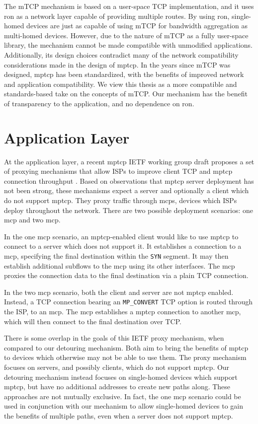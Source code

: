 \documentclass{cwru}
\begin{document}
The mTCP mechanism is based on a user-space TCP implementation, and it uses
\ac{ron} \cite{ron} as a network layer capable of providing multiple routes. By
using \ac{ron}, single-homed devices are just as capable of using mTCP for
bandwidth aggregation as multi-homed devices. However, due to the nature of mTCP
as a fully user-space library, the mechanism cannot be made compatible with
unmodified applications. Additionally, its design choices contradict many of the
network compatibility considerations made in the design of \ac{mptcp}. In the
years since mTCP was designed, \ac{mptcp} has been standardized, with the
benefits of improved network and application compatibility. We view this thesis
as a more compatible and standards-based take on the concepts of mTCP. Our
mechanism has the benefit of transparency to the application, and no dependence
on \ac{ron}.

\section{Application Layer}

At the application layer, a recent \ac{mptcp} IETF working group draft proposes
a set of proxying mechanisms that allow ISPs to improve client TCP and
\ac{mptcp} connection throughput \cite{boucadair-mptcp-plain-mode-10}. Based on
observations that \ac{mptcp} server deployment has not been strong, these
mechanisms expect a server and optionally a client which do not support
\ac{mptcp}. They proxy traffic through \acp{mcp}, devices which ISPs deploy
throughout the network. There are two possible deployment scenarios: one
\ac{mcp} and two \ac{mcp}.

In the one \ac{mcp} scenario, an \ac{mptcp}-enabled client would like to use
\ac{mptcp} to connect to a server which does not support it. It establishes a
connection to a \ac{mcp}, specifying the final destination within the
\texttt{SYN} segment. It may then establish additional subflows to the \ac{mcp}
using its other interfaces. The \ac{mcp} proxies the connection data to the
final destination via a plain TCP connection.

In the two \ac{mcp} scenario, both the client and server are not \ac{mptcp}
enabled. Instead, a TCP connection bearing an \texttt{MP\_CONVERT} TCP option is
routed through the ISP, to an \ac{mcp}. The \ac{mcp} establishes a \ac{mptcp}
connection to another \ac{mcp}, which will then connect to the final destination
over TCP.

There is some overlap in the goals of this IETF proxy mechanism, when compared
to our detouring mechanism. Both aim to bring the benefits of \ac{mptcp} to
devices which otherwise may not be able to use them. The proxy mechanism focuses
on servers, and possibly clients, which do not support \ac{mptcp}. Our detouring
mechanism instead focuses on single-homed devices which support \ac{mptcp}, but
have no additional addresses to create new paths along. These approaches are not
mutually exclusive. In fact, the one \ac{mcp} scenario could be used in
conjunction with our mechanism to allow single-homed devices to gain the
benefits of multiple paths, even when a server does not support \ac{mptcp}.
\end{document}
